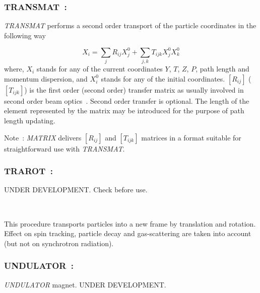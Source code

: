 \newpage

\subsubsection*{TRANSMAT~:  \TRANSMATTitl}\label{TRANSMAT}
\medskip

\textsl{TRANSMAT} performs a second order transport of the particle coordinates 
in the following way 

$$ X_i = \sum_j R_{ij}X^0_j + \sum_{j,k} T_{ijk}X^0_jX^0_k $$
%
 where, $ X_i $ stands for any of the current coordinates $ Y$, $T$, $Z$, $P $, path length and 
momentum dispersion, and $ X^0_i $ stands for any of the initial coordinates.
$[R_{ij}]$ ($[T_{ijk}]$) is the first order (second order) 
transfer matrix as usually involved in second order beam optics~\cite{Biblio10}.      %
Second order transfer is optional.  The length of the element represented by 
the matrix may be introduced for the purpose of path length updating.  

\bigskip

\noindent Note~: \textsl{MATRIX} delivers $[R_{ij}]$ and $[T_{ijk}]$ matrices in a format 
suitable for straightforward use with \textsl{TRANSMAT}.




\newpage

\subsubsection*{TRAROT~: \TRAROTTitl} \label{TRAROT} 
\medskip


UNDER DEVELOPMENT. Check before use. 

~

\noindent  This procedure transports particles into a new frame by translation and rotation. Effect on spin tracking, 
particle decay and gas-scattering are taken into account (but not on synchrotron radiation).





\newpage


\subsubsection*{UNDULATOR~: \UNDULATORTitl}\label{UNDULATOR}  

\medskip


\textsl{UNDULATOR} magnet. UNDER DEVELOPMENT. 



